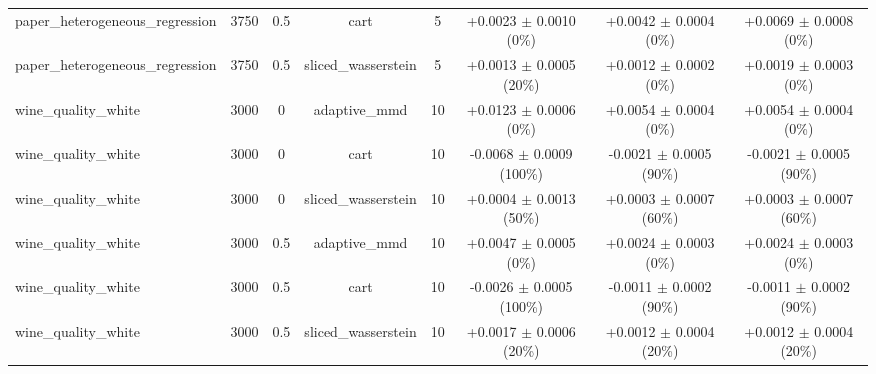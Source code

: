 \begin{table}[h]
\begin{adjustbox}{max width=\textwidth}
\begin{tabular}{lccccccc}
    paper\_heterogeneous\_regression & 3750 & 0.5 & cart & 5 & +0.0023 $\pm$ 0.0010 (0\%) & +0.0042 $\pm$ 0.0004 (0\%) & +0.0069 $\pm$ 0.0008 (0\%) \\
    paper\_heterogeneous\_regression & 3750 & 0.5 & sliced\_wasserstein & 5 & +0.0013 $\pm$ 0.0005 (20\%) & +0.0012 $\pm$ 0.0002 (0\%) & +0.0019 $\pm$ 0.0003 (0\%) \\
    wine\_quality\_white & 3000 & 0 & adaptive\_mmd & 10 & +0.0123 $\pm$ 0.0006 (0\%) & +0.0054 $\pm$ 0.0004 (0\%) & +0.0054 $\pm$ 0.0004 (0\%) \\
    wine\_quality\_white & 3000 & 0 & cart & 10 & -0.0068 $\pm$ 0.0009 (100\%) & -0.0021 $\pm$ 0.0005 (90\%) & -0.0021 $\pm$ 0.0005 (90\%) \\
    wine\_quality\_white & 3000 & 0 & sliced\_wasserstein & 10 & +0.0004 $\pm$ 0.0013 (50\%) & +0.0003 $\pm$ 0.0007 (60\%) & +0.0003 $\pm$ 0.0007 (60\%) \\
    wine\_quality\_white & 3000 & 0.5 & adaptive\_mmd & 10 & +0.0047 $\pm$ 0.0005 (0\%) & +0.0024 $\pm$ 0.0003 (0\%) & +0.0024 $\pm$ 0.0003 (0\%) \\
    wine\_quality\_white & 3000 & 0.5 & cart & 10 & -0.0026 $\pm$ 0.0005 (100\%) & -0.0011 $\pm$ 0.0002 (90\%) & -0.0011 $\pm$ 0.0002 (90\%) \\
    wine\_quality\_white & 3000 & 0.5 & sliced\_wasserstein & 10 & +0.0017 $\pm$ 0.0006 (20\%) & +0.0012 $\pm$ 0.0004 (20\%) & +0.0012 $\pm$ 0.0004 (20\%) \\
    \bottomrule
  \end{tabular}
  \end{adjustbox}
\end{table}
